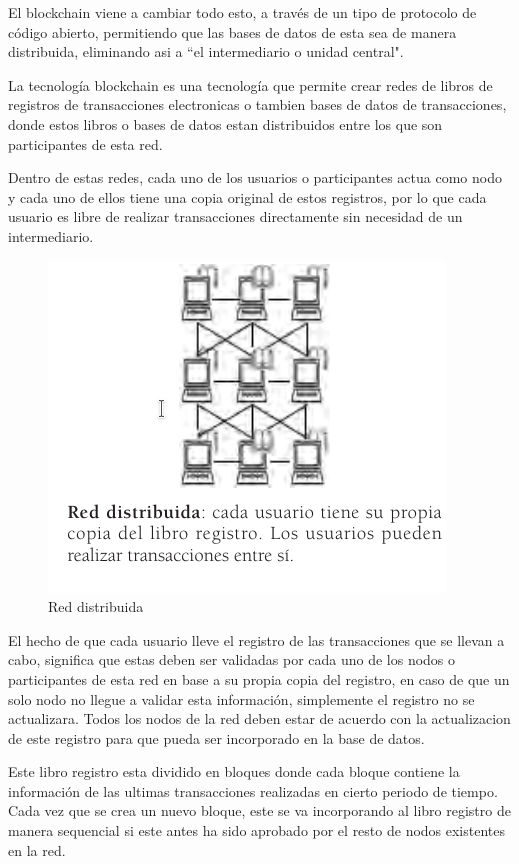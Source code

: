 \documentclass[conference]{IEEEtran}
\begin{document}
El blockchain viene a cambiar todo esto, a través de un tipo de protocolo de código abierto, permitiendo que las bases de datos de esta sea de manera distribuida, eliminando asi a ``el intermediario o unidad central".

La tecnología blockchain es una tecnología que permite crear redes de libros de registros de transacciones electronicas o tambien bases de datos de transacciones, donde estos libros o bases de datos estan distribuidos entre los que son participantes de esta red. \cite{blockchain1}

Dentro de estas redes, cada uno de los usuarios o participantes actua como nodo y cada uno de ellos tiene una copia original de estos registros, por lo que cada usuario es libre de realizar transacciones directamente sin necesidad de un intermediario.

\begin{figure}[htbp]
    \centering
    \includegraphics[scale=.8]{assets/images/red-distribuida.png}
    \caption{Red distribuida}
\end{figure}

El hecho de que cada usuario lleve el registro de las transacciones que se llevan a cabo, significa que estas deben ser validadas por cada uno de los nodos o participantes de esta red en base a su propia copia del registro, en caso de que un solo nodo no llegue a validar esta información, simplemente el registro no se actualizara. Todos los nodos de la red deben estar de acuerdo con la actualizacion de este registro para que pueda ser incorporado en la base de datos.

Este libro registro esta dividido en bloques donde cada bloque contiene la información de las ultimas transacciones realizadas en cierto periodo de tiempo. Cada vez que se crea un nuevo bloque, este se va incorporando al libro registro de manera sequencial si este antes ha sido aprobado por el resto de nodos existentes en la red.
\end{document}
